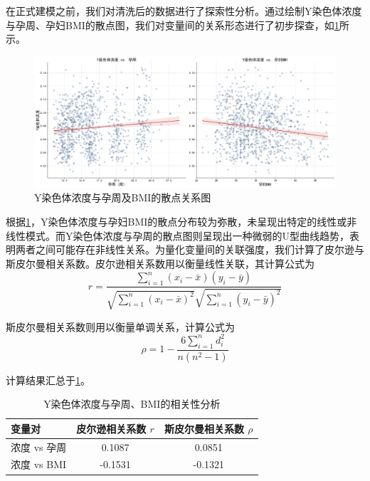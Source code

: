 在正式建模之前，我们对清洗后的数据进行了探索性分析。通过绘制Y染色体浓度与孕周、孕妇BMI的散点图，我们对变量间的关系形态进行了初步探查，如\cref{fig:scatter_plots}所示。

\begin{figure}[h!]
\centering
\includegraphics[width=1\textwidth]{figs/3问题一/Y浓度_vs_变量_散点图.png}
\caption{Y染色体浓度与孕周及BMI的散点关系图}
\label{fig:scatter_plots}
\end{figure}

根据\cref{fig:scatter_plots}，Y染色体浓度与孕妇BMI的散点分布较为弥散，未呈现出特定的线性或非线性模式。而Y染色体浓度与孕周的散点图则呈现出一种微弱的U型曲线趋势，表明两者之间可能存在非线性关系。为量化变量间的关联强度，我们计算了皮尔逊与斯皮尔曼相关系数。皮尔逊相关系数用以衡量线性关联，其计算公式为
\begin{equation}
r = \frac{\sum_{i=1}^{n}(x_i - \bar{x})(y_i - \bar{y})}{\sqrt{\sum_{i=1}^{n}(x_i - \bar{x})^2} \sqrt{\sum_{i=1}^{n}(y_i - \bar{y})^2}}
\end{equation}

斯皮尔曼相关系数则用以衡量单调关系，计算公式为
\begin{equation}
\rho = 1 - \frac{6 \sum_{i=1}^{n} d_i^2}{n(n^2 - 1)}
\end{equation}

计算结果汇总于\cref{tab:correlation}。

\begin{table}[h!]
\centering
\caption{Y染色体浓度与孕周、BMI的相关性分析}
\label{tab:correlation}
\begin{tabular}{lcc}
\hline
变量对 & 皮尔逊相关系数 $r$ & 斯皮尔曼相关系数 $\rho$ \\
\hline
浓度 vs 孕周 & 0.1087 & 0.0851 \\
浓度 vs BMI & -0.1531 & -0.1321 \\
\hline
\end{tabular}
\end{table}

